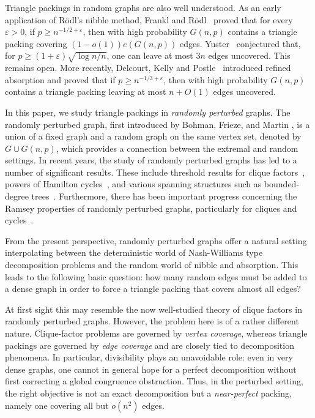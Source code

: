 \documentclass[11pt,reqno]{amsart}
\theoremstyle{definition}
\theoremstyle{remark}
\renewcommand\ge{\geqslant}
\begin{document}
Triangle packings in random graphs are also well understood. As an early application of R\"odl's nibble method, Frankl and R\"odl~\cite{FR} proved that for every $\varepsilon>0$, if $p\ge n^{-1/2+\varepsilon}$, then with high probability $G(n,p)$ contains a triangle packing covering $(1-o(1))e(G(n,p))$ edges. Yuster~\cite{Yuster} conjectured that, for $p\ge (1+\varepsilon)\sqrt{\log n/n}$, one can leave at most $3n$ edges uncovered. This remains open. More recently, Delcourt, Kelly and Postle~\cite{DKP} introduced refined absorption and proved that if $p\ge n^{-1/3+\varepsilon}$, then with high probability $G(n,p)$ contains a triangle packing leaving at most $n+O(1)$ edges uncovered.

In this paper, we study triangle packings in \emph{randomly perturbed} graphs. The randomly perturbed graph, first introduced by Bohman, Frieze, and Martin \cite{BFM}, is a union of a fixed graph and a random graph on the same vertex set, denoted by $G\cup G(n,p)$, which provides a connection between the extremal and random settings. In recent years, the study of randomly perturbed graphs has led to a number of significant results. These include threshold results for clique factors~\cite{BTW,HMT,BPSS,AKRT}, powers of Hamilton cycles~\cite{BDF}, and various spanning structures such as bounded-degree trees~\cite{JK,KKS,BMPP}. Furthermore, there has been important progress concerning the Ramsey properties of randomly perturbed graphs, particularly for cliques and cycles~\cite{DT}. 


From the present perspective, randomly perturbed graphs offer a natural setting interpolating between the deterministic world of Nash-Williams type decomposition problems and the random world of nibble and absorption. This leads to the following basic question: how many random edges must be added to a dense graph in order to force a triangle packing that covers almost all edges?

At first sight this may resemble the now well-studied theory of clique factors in randomly perturbed graphs. However, the problem here is of a rather different nature. Clique-factor problems are governed by \emph{vertex coverage}, whereas triangle packings are governed by \emph{edge coverage} and are closely tied to decomposition phenomena. In particular, divisibility plays an unavoidable role: even in very dense graphs, one cannot in general hope for a perfect decomposition without first correcting a global congruence obstruction. Thus, in the perturbed setting, the right objective is not an exact decomposition but a \emph{near-perfect} packing, namely one covering all but $o(n^2)$ edges.
\end{document}
